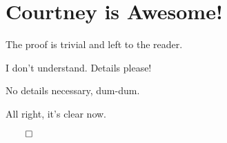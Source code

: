 \documentclass{amsart}
\begin{document}
\section{Courtney is Awesome!}

The proof is trivial and left to the reader.

I don't understand. Details please!

No details necessary, dum-dum.

All right, it's clear now.

$\qed$
\end{document}
